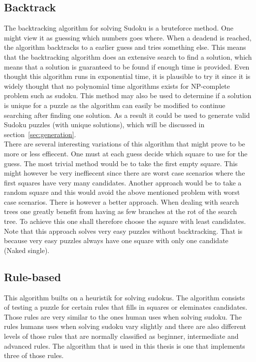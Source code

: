 \documentclass[a4paper,11pt]{kth-mag}
\begin{document}
\subsection{Backtrack}
The backtracking algorithm for solving Sudoku is a bruteforce method.
One might view it as guessing which numbers goes where.
When a deadend is reached, the algorithm backtracks to a earlier guess and tries something else.
This means that the backtracking algorithm does an extensive search to find a solution, which means that a solution is guaranteed to be found if enough time is provided.
Even thought this algorithm runs in exponential time, it is plausible to try it since it is widely thought that no polynomial time algorithms exists for NP-complete problem such as sudoku. 
This method may also be used to determine if a solution is unique for a puzzle as the algorithm can easily be modified to continue searching after finding one solution.
As a result it could be used to generate valid Sudoku puzzles (with unique solutions), which will be discussed in section~\ref{sec:generation}.\\
There are several interesting variations of this algorithm that might prove to be more or less effiecent.
One must at each guess decide which square to use for the guess.
The most trivial method would be to take the first empty square.
This might however be very ineffiecent since there are worst case scenarios where the first squares have very many candidates.
Another approach would be to take a random square and this would avoid the above mentioned problem with worst case scenarios.
There is however a better approach.
When dealing with search trees one greatly benefit from having as few branches at the rot of the search tree.
To achieve this one shall therefore choose the square with least candidates.
Note that this approach solves very easy puzzles without backtracking.
That is because very easy puzzles always have one square with only one candidate (Naked single).

\FloatBarrier
\subsection{Rule-based}
This algorithm builts on a heuristik for solving sudokus.
The algorithm consists of testing a puzzle for certain rules that fills in squares or eleminates candidates.
Those rules are very similar to the ones human uses when solving sudoku.
The rules humans uses when solving sudoku vary slightly and there are also different levels of those rules that are normally classified as beginner, intermediate and advanced rules.
The algorithm that is used in this thesis is one that implements three of those rules.
\end{document}

